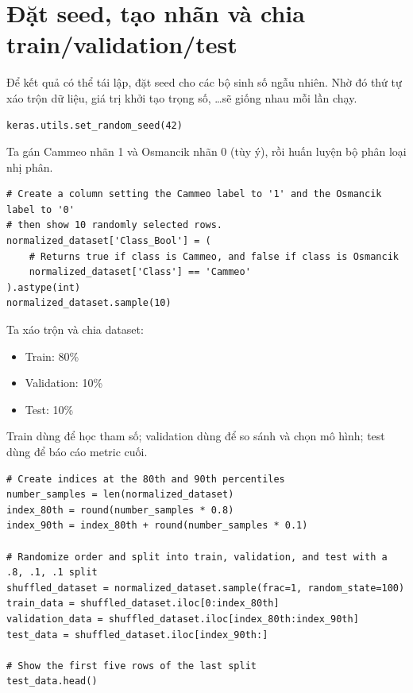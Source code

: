 \documentclass[12pt,a4paper]{article}
\begin{document}
\section{Đặt seed, tạo nhãn và chia train/validation/test}

\begin{phuongphap}[title={Đặt seed để tái lập thí nghiệm}]
Để kết quả có thể tái lập, đặt seed cho các bộ sinh số ngẫu nhiên.
Nhờ đó thứ tự xáo trộn dữ liệu, giá trị khởi tạo trọng số, \ldots sẽ giống nhau mỗi lần chạy.
\end{phuongphap}

\begin{lstlisting}
keras.utils.set_random_seed(42)
\end{lstlisting}

\begin{dongco}[title={Tạo nhãn nhị phân}]
Ta gán Cammeo nhãn 1 và Osmancik nhãn 0 (tùy ý), rồi huấn luyện bộ phân loại nhị phân.
\end{dongco}

\begin{lstlisting}
# Create a column setting the Cammeo label to '1' and the Osmancik label to '0'
# then show 10 randomly selected rows.
normalized_dataset['Class_Bool'] = (
    # Returns true if class is Cammeo, and false if class is Osmancik
    normalized_dataset['Class'] == 'Cammeo'
).astype(int)
normalized_dataset.sample(10)
\end{lstlisting}

\begin{phuongphap}[title={Chia tập train/validation/test (80\%/10\%/10\%)}]
Ta xáo trộn và chia dataset:
\begin{itemize}
  \item Train: 80\%
  \item Validation: 10\%
  \item Test: 10\%
\end{itemize}
Train dùng để học tham số; validation dùng để so sánh và chọn mô hình; test dùng để báo cáo metric cuối.
\end{phuongphap}

\begin{lstlisting}
# Create indices at the 80th and 90th percentiles
number_samples = len(normalized_dataset)
index_80th = round(number_samples * 0.8)
index_90th = index_80th + round(number_samples * 0.1)

# Randomize order and split into train, validation, and test with a .8, .1, .1 split
shuffled_dataset = normalized_dataset.sample(frac=1, random_state=100)
train_data = shuffled_dataset.iloc[0:index_80th]
validation_data = shuffled_dataset.iloc[index_80th:index_90th]
test_data = shuffled_dataset.iloc[index_90th:]

# Show the first five rows of the last split
test_data.head()
\end{lstlisting}
\end{document}
